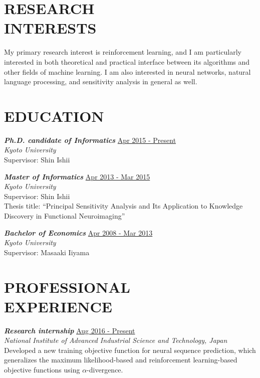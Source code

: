 \documentclass[margin, 10pt]{res} %
\begin{document}
\begin{resume}

\section{{\small RESEARCH\\INTERESTS}}

My primary research interest is reinforcement learning, and I am particularly interested in both theoretical and practical interface between its algorithms and other fields of machine learning. I am also interested in neural networks, natural language processing, and sensitivity analysis in general as well.

\section{{\small EDUCATION}}

{\sl {\bf Ph.D. candidate of Informatics}} \hfill {\small \underline{Apr 2015 - Present}} \\
{\it Kyoto University} \\
Supervisor: Shin Ishii

{\sl {\bf Master of Informatics}} \hfill {\small \underline{Apr 2013 - Mar 2015}}  \\
{\it Kyoto University} \\
Supervisor: Shin Ishii \\
Thesis title: ``Principal Sensitivity Analysis and Its Application to Knowledge Discovery in Functional Neuroimaging''

{\sl {\bf Bachelor of Economics}} \hfill {\small \underline{Apr 2008 - Mar 2013}} \\
{\it Kyoto University} \\
Supervisor: Masaaki Iiyama
  
\section{{\small PROFESSIONAL\\EXPERIENCE}}

{\sl {\bf Research internship}} \hfill {\small \underline{Aug 2016 - Present}} \\
{\it National Institute of Advanced Industrial Science and Technology, Japan} \\
Developed a new training objective function for neural sequence prediction, which generalizes the maximum likelihood-based and reinforcement learning-based objective functions using $\alpha$-divergence.


\end{resume}
\end{document}
